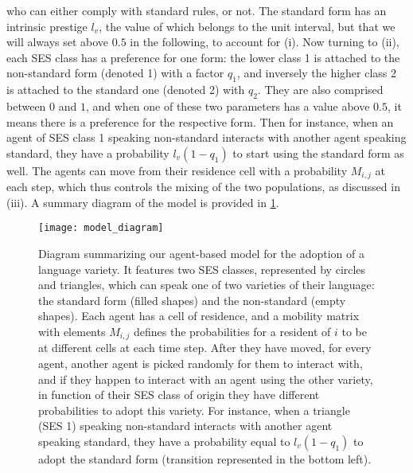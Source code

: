 \documentclass[../thesis.tex]{subfiles}
\begin{document}
who can either comply with standard rules, or not. The standard form has an intrinsic
prestige $l_v$, the value of which belongs to the unit interval, but that we will always
set above $0.5$ in the following, to account for (i). Now turning to (ii), each \ac{SES}
class has a preference for one form: the lower class 1 is attached to the non-standard
form (denoted 1) with a factor $q_1$, and inversely the higher class 2 is attached to
the standard one (denoted 2) with $q_2$. They are also comprised between $0$ and $1$,
and when one of these two parameters has a value above $0.5$, it means there is a
preference for the respective form. Then for instance, when an agent of \ac{SES} class 1
speaking non-standard interacts with another agent speaking standard, they have a
probability $l_v (1 - q_1)$ to start using the standard form as well. The agents can
move from their residence cell with a probability $M_{i,j}$ at each step, which thus
controls the mixing of the two populations, as discussed in (iii). A summary diagram of
the model is provided in \cref{fig:model_diagram}.
\begin{figure}
\centering
  \texttt{[image: model\_diagram]}
  \caption{Diagram summarizing our agent-based model for the adoption of a language
  variety. It features two \ac{SES} classes, represented by circles and triangles, which
  can speak one of two varieties of their language: the standard form (filled shapes)
  and the non-standard (empty shapes). Each agent has a cell of residence, and a
  mobility matrix with elements $M_{i, j}$ defines the probabilities for a resident of
  $i$ to be at different cells at each time step. After they have moved, for every
  agent, another agent is picked randomly for them to interact with, and if they happen
  to interact with an agent using the other variety, in function of their \ac{SES} class
  of origin they have different probabilities to adopt this variety. For instance, when
  a triangle (\ac{SES} 1) speaking non-standard interacts with another agent speaking
  standard, they have a probability equal to $l_v (1 - q_1)$ to adopt the standard form
  (transition represented in the bottom left).}
  \label{fig:model_diagram}
\end{figure}
\end{document}
